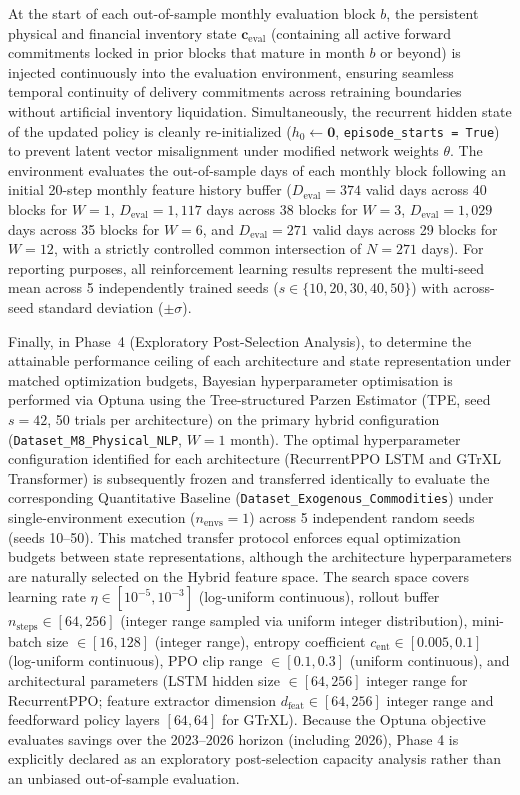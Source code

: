 At the start of each out-of-sample monthly evaluation block $b$, the persistent physical and financial inventory state $\mathbf{c}_{\text{eval}}$ (containing all active forward commitments locked in prior blocks that mature in month $b$ or beyond) is injected continuously into the evaluation environment, ensuring seamless temporal continuity of delivery commitments across retraining boundaries without artificial inventory liquidation. Simultaneously, the recurrent hidden state of the updated policy is cleanly re-initialized ($h_0 \leftarrow \mathbf{0}$, \texttt{episode\_starts = True}) to prevent latent vector misalignment under modified network weights $\theta$. The environment evaluates the out-of-sample days of each monthly block following an initial 20-step monthly feature history buffer ($D_{\text{eval}} = 374$ valid days across 40 blocks for $W=1$, $D_{\text{eval}} = 1{,}117$ days across 38 blocks for $W=3$, $D_{\text{eval}} = 1{,}029$ days across 35 blocks for $W=6$, and $D_{\text{eval}} = 271$ valid days across 29 blocks for $W=12$, with a strictly controlled common intersection of $N=271$ days). For reporting purposes, all reinforcement learning results represent the multi-seed mean across 5 independently trained seeds ($s \in \{10, 20, 30, 40, 50\}$) with across-seed standard deviation ($\pm \sigma$).

Finally, in Phase~4 (Exploratory Post-Selection Analysis), to determine the attainable performance ceiling of each architecture and state representation under matched optimization budgets, Bayesian hyperparameter optimisation is performed via Optuna \cite{akiba2019optuna} using the Tree-structured Parzen Estimator (TPE, seed $s=42$, 50 trials per architecture) on the primary hybrid configuration (\texttt{Dataset\_\allowbreak M8\_\allowbreak Physical\_\allowbreak NLP}, $W=1$ month). The optimal hyperparameter configuration identified for each architecture (RecurrentPPO LSTM and GTrXL Transformer) is subsequently frozen and transferred identically to evaluate the corresponding Quantitative Baseline (\texttt{Dataset\_\allowbreak Exogenous\_\allowbreak Commodities}) under single-environment execution ($n_{\text{envs}}=1$) across 5 independent random seeds (seeds 10--50). This matched transfer protocol enforces equal optimization budgets between state representations, although the architecture hyperparameters are naturally selected on the Hybrid feature space. The search space covers learning rate $\eta \in [10^{-5}, 10^{-3}]$ (log-uniform continuous), rollout buffer $n_{\text{steps}} \in [64, 256]$ (integer range sampled via uniform integer distribution), mini-batch size $\in [16, 128]$ (integer range), entropy coefficient $c_{\text{ent}} \in [0.005, 0.1]$ (log-uniform continuous), PPO clip range $\in [0.1, 0.3]$ (uniform continuous), and architectural parameters (LSTM hidden size $\in [64, 256]$ integer range for RecurrentPPO; feature extractor dimension $d_{\text{feat}} \in [64, 256]$ integer range and feedforward policy layers $[64, 64]$ for GTrXL). Because the Optuna objective evaluates savings over the 2023--2026 horizon (including 2026), Phase 4 is explicitly declared as an exploratory post-selection capacity analysis rather than an unbiased out-of-sample evaluation.

